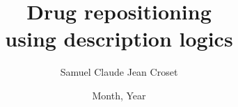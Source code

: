 
\title{Drug repositioning\\
using description logics}

\author{Samuel Claude Jean Croset}





\date{Month, Year}
